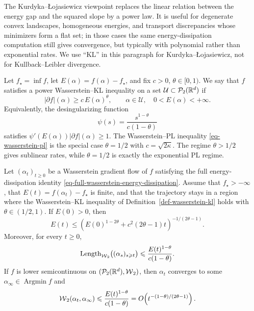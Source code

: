 The Kurdyka--{\L}ojasiewicz viewpoint replaces the linear relation between the energy gap and the squared slope by a power law. It is useful for degenerate convex landscapes, homogeneous energies, and transport discrepancies whose minimizers form a flat set; in those cases the same energy-dissipation computation still gives convergence, but typically with polynomial rather than exponential rates. We use ``KL'' in this paragraph for Kurdyka--{\L}ojasiewicz, not for Kullback--Leibler divergence.

\begin{defn}\label{def-wasserstein-kl}
	Let \(f_\star=\inf f\), let \(E(\alpha)=f(\alpha)-f_\star\), and fix \(c>0\), \(\theta\in[0,1)\). We say that \(f\) satisfies a power Wasserstein--KL inequality on a set \(\mathcal U\subset \mathcal{P}_2(\mathbb{R}^d)\) if
	\[
		|\partial f|(\alpha)
		\geq
		c\,E(\alpha)^\theta,
		\qquad
		\alpha\in\mathcal U,
		\quad
		0<E(\alpha)<+\infty.
	\]
	Equivalently, the desingularizing function
	\[
		\psi(s)=\frac{s^{1-\theta}}{c(1-\theta)}
	\]
	satisfies \(\psi'(E(\alpha))|\partial f|(\alpha)\geq 1\). The Wasserstein--PL inequality \eqref{eq-wasserstein-pl} is the special case \(\theta=1/2\) with \(c=\sqrt{2\kappa}\). The regime \(\theta>1/2\) gives sublinear rates, while \(\theta=1/2\) is exactly the exponential PL regime.
\end{defn}

\begin{thm}\label{thm-wasserstein-kl-sublinear}
	Let \((\alpha_t)_{t\geq0}\) be a Wasserstein gradient flow of \(f\) satisfying the full energy-dissipation identity \eqref{eq-full-wasserstein-energy-dissipation}. Assume that \(f_\star> -\infty\), that \(E(t)=f(\alpha_t)-f_\star\) is finite, and that the trajectory stays in a region where the Wasserstein--KL inequality of Definition~\ref{def-wasserstein-kl} holds with \(\theta\in(1/2,1)\). If \(E(0)>0\), then
	\[
		E(t)
		\leq
		\left(E(0)^{1-2\theta}+c^2(2\theta-1)t\right)^{-1/(2\theta-1)}.
	\]
	Moreover, for every \(t\geq0\),
	\[
		\operatorname{Length}_{\operatorname{\mathcal{W}}_2}\bigl((\alpha_s)_{s\geqslant t}\bigr)
		\leqslant
		\frac{E(t)^{1-\theta}}{c(1-\theta)}.
	\]
	If \(f\) is lower semicontinuous on \((\mathcal{P}_2(\mathbb{R}^d),\operatorname{\mathcal{W}}_2)\), then \(\alpha_t\) converges to some \(\alpha_\infty\in\operatorname{Argmin}f\) and
	\[
		\operatorname{\mathcal{W}}_2(\alpha_t,\alpha_\infty)
		\leqslant
		\frac{E(t)^{1-\theta}}{c(1-\theta)}
		=
		O\!\left(t^{-(1-\theta)/(2\theta-1)}\right).
	\]
\end{thm}

